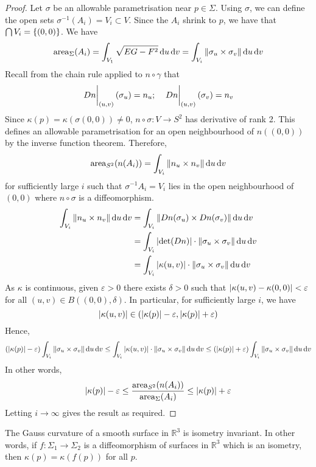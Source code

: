 \begin{proof}
	Let \( \sigma \) be an allowable parametrisation near \( p \in \Sigma \).
	Using \( \sigma \), we can define the open sets \( \sigma^{-1}(A_i) = V_i \subset V \).
	Since the \( A_i \) shrink to \( p \), we have that \( \bigcap V_i = \qty{(0,0)} \).
	We have
	\[ \mathrm{area}_\Sigma(A_i) = \int_{V_1} \sqrt{EG - F^2} \dd{u} \dd{v} = \int_{V_i} \norm{\sigma_u \times \sigma_v} \dd{u}\dd{v} \]
	Recall from the chain rule applied to \( n \circ \gamma \) that
	\[ \eval{Dn}_{(u,v)}(\sigma_u) = n_u;\quad \eval{Dn}_{(u,v)}(\sigma_v) = n_v \]
	Since \( \kappa(p) = \kappa(\sigma(0,0)) \neq 0 \), \( n \circ \sigma \colon V \to S^2 \) has derivative of rank 2.
	This defines an allowable parametrisation for an open neighbourhood of \( n((0,0)) \) by the inverse function theorem.
	Therefore,
	\[ \mathrm{area}_{S^2}(n(A_i)) = \int_{V_i} \norm{n_u \times n_v} \dd{u} \dd{v} \]
	for sufficiently large \( i \) such that \( \sigma^{-1} A_i = V_i \) lies in the open neighbourhood of \( (0,0) \) where \( n \circ \sigma \) is a diffeomorphism.
	\begin{align*}
		\int_{V_i} \norm{n_u \times n_v} \dd{u} \dd{v} &= \int_{V_i} \norm{Dn(\sigma_u) \times Dn(\sigma_v)} \dd{u} \dd{v} \\
		&= \int_{V_i} \abs{\det (Dn)} \cdot \norm{\sigma_u \times \sigma_v} \dd{u} \dd{v} \\
		&= \int_{V_i} \abs{\kappa(u,v)} \cdot \norm{\sigma_u \times \sigma_v} \dd{u}\dd{v}
	\end{align*}
	As \( \kappa \) is continuous, given \( \varepsilon > 0 \) there exists \( \delta > 0 \) such that \( \abs{\kappa(u,v) - \kappa(0,0)} < \varepsilon \) for all \( (u,v) \in B((0,0), \delta) \).
	In particular, for sufficiently large \( i \), we have
	\[ \abs{\kappa(u,v)} \in \qty(\abs{\kappa(p)}-\varepsilon, \abs{\kappa(p)}+\varepsilon) \]
	Hence,
	\[ \qty(\abs{\kappa(p)}-\varepsilon) \int_{V_i} \norm{\sigma_u \times \sigma_v} \dd{u}\dd{v} \leq \int_{V_i} \abs{\kappa(u,v)} \cdot \norm{\sigma_u \times \sigma_v} \dd{u}\dd{v} \leq \qty(\abs{\kappa(p)}+\varepsilon) \int_{V_i} \norm{\sigma_u \times \sigma_v} \dd{u}\dd{v} \]
	In other words,
	\[ \abs{\kappa(p)}-\varepsilon \leq \frac{\mathrm{area}_{S^2} (n(A_i))}{\mathrm{area}_{\Sigma} (A_i)} \leq \abs{\kappa(p)} + \varepsilon \]
	Letting \( i \to \infty \) gives the result as required.
\end{proof}
\begin{theorem}
	The Gauss curvature of a smooth surface in \( \mathbb R^3 \) is isometry invariant.
	In other words, if \( f \colon \Sigma_1 \to \Sigma_2 \) is a diffeomorphism of surfaces in \( \mathbb R^3 \) which is an isometry, then \( \kappa(p) = \kappa(f(p)) \) for all \( p \).
\end{theorem}
